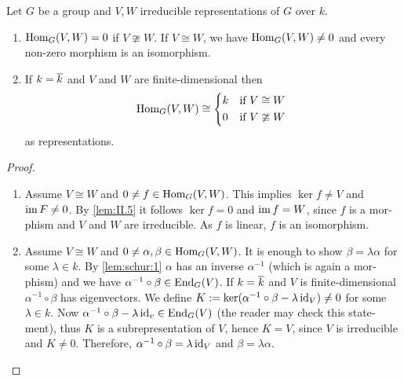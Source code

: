 \documentclass[12pt,a4paper]{scrartcl}
\theoremstyle{cplain}
\theoremstyle{cplain}
\theoremstyle{cplain}
\theoremstyle{definition}
\begin{document}
\begin{otherlanguage}{english}
\begin{lem} \label{lem:schur}
  Let $G$ be a group and $V,W$ irreducible representations of $G$ over $k$.
  \begin{enumerate}
    \item\label{lem:schur:1} $\operatorname{Hom}_G(V,W) = 0$ if $V \ncong W$. If $V \cong W$, we have $\operatorname{Hom}_G(V,W) \neq 0 $ and every non-zero morphism is an isomorphism.
    \item\label{lem:schur:2} If $k = \overline k$ and $V$ and $W$ are finite-dimensional then \[ \Hom_G(V,W) \cong \begin{cases*}
                                                                                            k & if $V \cong W$ \\
                                                                                            0 & if $V \ncong W$
                                                                                          \end{cases*} \]
    as representations.
  \end{enumerate}
\end{lem}
\begin{proof}
  \leavevmode
  \begin{enumerate}[label=\ref{lem:schur:\arabic*}]
    \item Assume $V \cong W$ and $0\neq f \in \operatorname{Hom}_G(V,W)$. This implies $\ker f \neq V$ and $\operatorname{im} F \neq 0$. By \cref{lem:II.5} it follows $\ker f = 0$ and $\operatorname{im} f = W$, since $f$ is a morphism and $V$ and $W$ are irreducible. As $f$ is linear, $f$ is an isomorphism.
    \item Assume $V \cong W$ and $0\neq \alpha,\beta \in \operatorname{Hom}_G(V,W)$. It is enough to show $\beta = \lambda\alpha$ for some $\lambda \in k$. By \ref{lem:schur:1} $\alpha$ has an inverse $\alpha^{-1}$ (which is again a morphism) and we have $\alpha^{-1}\circ\beta \in \operatorname{End}_G(V)$. If $k=\overline k$ and $V$ is finite-dimensional $\alpha^{-1}\circ\beta$ has eigenvectors. We define $K := \operatorname{ker}(\alpha^{-1}\circ\beta -\lambda\operatorname{id}_V) \neq 0$ for some $\lambda \in k$. Now $\alpha^{-1}\circ\beta - \lambda \operatorname{id}_v \in \operatorname{End}_G(V)$ (the reader may check this statement), thus $K$ is a subrepresentation of $V$, hence $K=V$, since $V$ is irreducible and $K \neq 0$. Therefore, $\alpha^{-1}\circ\beta = \lambda\operatorname{id}_V$ and $\beta = \lambda \alpha$.
    \qedhere
  \end{enumerate}
\end{proof}


\end{otherlanguage}
\end{document}
